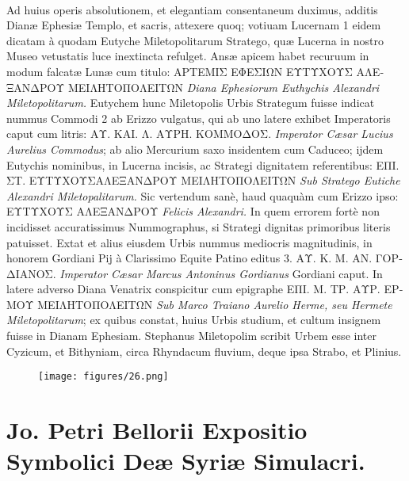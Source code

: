 \documentclass[a4paper, 11pt, oneside, polutonikogreek, latin]{article}
\begin{document}
\paragraph{}
Ad huius operis absolutionem, et elegantiam consentaneum duximus, additis Dianæ Ephesiæ Templo, et sacris, attexere quoq; votiuam Lucernam 1 eidem dicatam à quodam Eutyche Miletopolitarum Stratego, quæ Lucerna in nostro Museo vetustatis luce inextincta refulget. Ansæ apicem habet recuruum in modum falcatæ Lunæ cum titulo: \foreignlanguage{greek}{ΑΡΤΕΜΙΣ ΕΦΕΣΙΩΝ ΕΥΤΥΧΟΥΣ ΑΛΕΞΑΝΔΡΟΥ ΜΕΙΛΗΤΟΠΟΛΕΙΤΩΝ} \emph{Diana Ephesiorum Euthychis Alexandri Miletopolitarum.} Eutychem hunc Miletopolis Urbis Strategum fuisse indicat nummus Commodi 2 ab Erizzo vulgatus, qui ab uno latere exhibet Imperatoris caput cum litris: \foreignlanguage{greek}{ΑΥ. ΚΑΙ. Λ. ΑΥΡΗ. ΚΟΜΜΟΔΟΣ}. \emph{Imperator Cæsar Lucius Aurelius Commodus}; ab alio Mercurium saxo insidentem cum Caduceo; ijdem Eutychis nominibus, in Lucerna incisis, ac Strategi dignitatem referentibus: \foreignlanguage{greek}{ΕΠΙ. ΣΤ. ΕΥΤΥΧΟΥΣΑΛΕΞΑΝΔΡΟΥ ΜΕΙΛΗΤΟΠΟΛΕΙΤΩΝ} \emph{Sub Stratego Eutiche Alexandri Miletopalitarum.} Sic vertendum sanè, haud quaquàm cum Erizzo ipso: \foreignlanguage{greek}{ΕΥΤΥΧΟΥΣ ΑΛΕΞΑΝΔΡΟΥ} \emph{Felicis Alexandri.} In quem errorem fortè non incidisset accuratissimus Nummographus, si Strategi dignitas primoribus literis patuisset. Extat et alius eiusdem Urbis nummus mediocris magnitudinis, in honorem Gordiani Pij à Clarissimo Equite Patino editus 3. \foreignlanguage{greek}{ΑΥ. Κ. Μ. ΑΝ. ΓΟΡΔΙΑΝΟΣ}. \emph{Imperator Cæsar Marcus Antoninus Gordianus} Gordiani caput. In latere adverso Diana Venatrix conspicitur cum epigraphe \foreignlanguage{greek}{ΕΠΙ. Μ. ΤΡ. ΑΥΡ. ΕΡΜΟΥ ΜΕΙΛΗΤΟΠΟΛΕΙΤΩΝ} \emph{Sub Marco Traiano Aurelio Herme, seu Hermete Miletopolitarum}; ex quibus constat, huius Urbis studium, et cultum insignem fuisse in Dianam Ephesiam. Stephanus Miletopolim scribit Urbem esse inter Cyzicum, et Bithyniam, circa Rhyndacum fluvium, deque ipsa Strabo, et Plinius.
\clearpage
\vspace*{\fill}
\begin{figure}[H]
\centering
\texttt{[image: figures/26.png]}
\end{figure}
\vspace*{\fill}
\clearpage
\section{Jo. Petri Bellorii Expositio Symbolici Deæ Syriæ Simulacri.}
\end{document}
